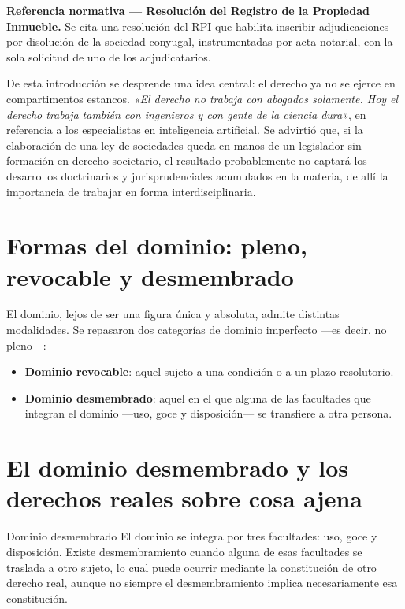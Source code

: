 \documentclass[12pt,oneside]{book}
\begin{document}
\begin{important}
\textbf{Referencia normativa ---  Resolución del Registro de la Propiedad Inmueble.} Se cita una resolución del RPI que habilita inscribir adjudicaciones por disolución de la sociedad conyugal, instrumentadas por acta notarial, con la sola solicitud de uno de los adjudicatarios.
\end{important}

De esta introducción se desprende una idea central: el derecho ya no se ejerce en compartimentos estancos. \textit{«El derecho no trabaja con abogados solamente. Hoy el derecho trabaja también con ingenieros y con gente de la ciencia dura»}, en referencia a los especialistas en inteligencia artificial. Se advirtió que, si la elaboración de una ley de sociedades queda en manos de un legislador sin formación en derecho societario, el resultado probablemente no captará los desarrollos doctrinarios y jurisprudenciales acumulados en la materia, de allí la importancia de trabajar en forma interdisciplinaria.

\section{Formas del dominio: pleno, revocable y desmembrado}

El dominio, lejos de ser una figura única y absoluta, admite distintas modalidades. Se repasaron dos categorías de dominio imperfecto ---es decir, no pleno---:

\begin{itemize}
    \item \textbf{Dominio revocable}: aquel sujeto a una condición o a un plazo resolutorio.
    \item \textbf{Dominio desmembrado}: aquel en el que alguna de las facultades que integran el dominio ---uso, goce y disposición--- se transfiere a otra persona.
\end{itemize}

\section{El dominio desmembrado y los derechos reales sobre cosa ajena}

\begin{definition}{Dominio desmembrado}
El dominio se integra por tres facultades: uso, goce y disposición. Existe desmembramiento cuando alguna de esas facultades se traslada a otro sujeto, lo cual puede ocurrir mediante la constitución de otro derecho real, aunque no siempre el desmembramiento implica necesariamente esa constitución.
\end{definition}
\end{document}
